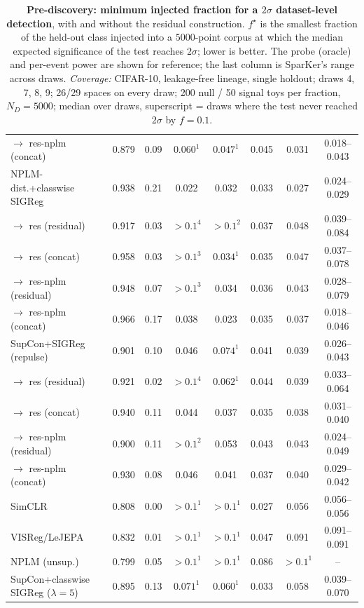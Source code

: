 \begin{table}[t]
\begin{tabular}{lcccccc c}
\quad $\to$ res-nplm (concat) & 0.879 & 0.09 & $0.060^{1}$ & $0.047^{1}$ & 0.045 & 0.031 & 0.018--0.043 \\
\addlinespace
NPLM-dist.+classwise SIGReg & 0.938 & 0.21 & 0.022 & 0.032 & 0.033 & 0.027 & 0.024--0.029 \\
\quad $\to$ res (residual) & 0.917 & 0.03 & $>0.1^{4}$ & $>0.1^{2}$ & 0.037 & 0.048 & 0.039--0.084 \\
\quad $\to$ res (concat) & 0.958 & 0.03 & $>0.1^{3}$ & $0.034^{1}$ & 0.035 & 0.047 & 0.037--0.078 \\
\quad $\to$ res-nplm (residual) & 0.948 & 0.07 & $>0.1^{3}$ & 0.034 & 0.036 & 0.043 & 0.028--0.079 \\
\quad $\to$ res-nplm (concat) & 0.966 & 0.17 & 0.038 & 0.023 & 0.035 & 0.037 & 0.018--0.046 \\
\addlinespace
SupCon+SIGReg (repulse) & 0.901 & 0.10 & 0.046 & $0.074^{1}$ & 0.041 & 0.039 & 0.026--0.043 \\
\quad $\to$ res (residual) & 0.921 & 0.02 & $>0.1^{4}$ & $0.062^{1}$ & 0.044 & 0.039 & 0.033--0.064 \\
\quad $\to$ res (concat) & 0.940 & 0.11 & 0.044 & 0.037 & 0.035 & 0.038 & 0.031--0.040 \\
\quad $\to$ res-nplm (residual) & 0.900 & 0.11 & $>0.1^{2}$ & 0.053 & 0.043 & 0.043 & 0.024--0.049 \\
\quad $\to$ res-nplm (concat) & 0.930 & 0.08 & 0.046 & 0.041 & 0.037 & 0.040 & 0.029--0.042 \\
\addlinespace
SimCLR & 0.808 & 0.00 & $>0.1^{1}$ & $>0.1^{1}$ & 0.027 & 0.056 & 0.056--0.056 \\
\addlinespace
VISReg/LeJEPA & 0.832 & 0.01 & $>0.1^{1}$ & $>0.1^{1}$ & 0.047 & 0.091 & 0.091--0.091 \\
\addlinespace
NPLM (unsup.) & 0.799 & 0.05 & $>0.1^{1}$ & $>0.1^{1}$ & 0.086 & $>0.1^{1}$ & -- \\
\addlinespace
SupCon+classwise SIGReg ($\lambda{=}5$) & 0.895 & 0.13 & $0.071^{1}$ & $0.060^{1}$ & 0.033 & 0.058 & 0.039--0.070 \\
\bottomrule
\end{tabular}
\caption{\textbf{Pre-discovery: minimum injected fraction for a $2\sigma$ dataset-level detection}, with and without the residual construction. $f^\star$ is the smallest fraction of the held-out class injected into a $5000$-point corpus at which the median expected significance of the test reaches $2\sigma$; lower is better. The probe (oracle) and per-event power are shown for reference; the last column is SparKer's range across draws. \emph{Coverage:} CIFAR-10, leakage-free lineage, single holdout; draws {4, 7, 8, 9}; 26/29 spaces on every draw; 200 null / 50 signal toys per fraction, $N_D{=}5000$; median over draws, superscript = draws where the test never reached $2\sigma$ by $f{=}0.1$.}
\label{tab:sigma_pre_cifar10}
\end{table}
